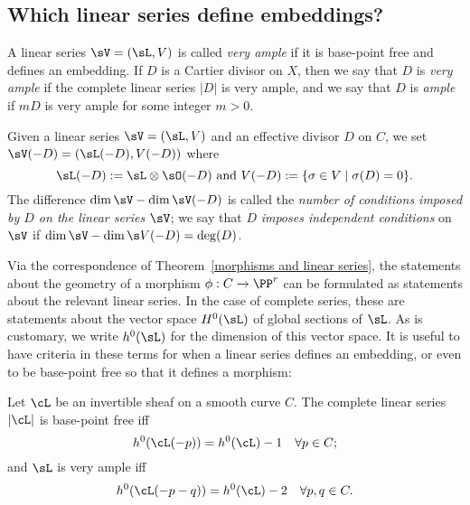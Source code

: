 \subsection{Which linear series define embeddings?}

A linear series $\sV = (\sL, V)$ is called  \emph{very ample}  if it is base-point free and defines an embedding. If $D$ is a Cartier divisor on $X$, then we say that $D$ is \emph{very ample} if the complete linear series $|D|$ is very ample, and we say that $D$ is \emph{ample} if $mD$ is very ample for some integer $m>0$.

Given a linear series $\sV = (\sL, V)$ and an effective divisor $D$ on $C$, we  set
$
\sV(-D) = (\sL(-D),V(-D))
$
where
$$
\sL(-D): = \sL \otimes \sO(-D)\hbox{ and } V(-D) := \{ \sigma \in V \mid \sigma(D) = 0 \}.
$$
The difference $\dim \sV - \dim \sV(-D)$ is called the \emph{number of conditions imposed by $D$ on the linear series $\sV$}; we say that $D$ \emph{imposes independent conditions} on $\sV$ if $\dim \sV - \dim \s V(-D) = \deg(D)$.

Via the correspondence of Theorem~\ref{morphisms and linear series}, the statements about the geometry of a morphism $\phi : C \to \PP^r$ can be formulated as statements about the relevant linear series. In the case of complete series, these are statements about the vector space $H^{0}(\sL)$ of global sections of $\sL$. As is customary, we write $h^{0}(\sL)$ for the dimension of this vector space. It is useful to have criteria
in these terms for when a linear series defines an embedding, or even to be base-point free so that it
defines a morphism:

\begin{proposition}\label{very ample}\cite[Thm. IV.3.1]{H}
Let $\cL$ be an invertible sheaf on a smooth curve $C$. The complete linear series $|\cL|$ is base-point free iff
$$
h^0(\cL(-p)) = h^0(\cL) - 1 \quad \forall p \in C;
$$
and $\sL$ is very ample iff
$$
h^0(\cL(-p-q)) = h^0(\cL) - 2 \quad \forall p, q \in C.
$$
\end{proposition} 

